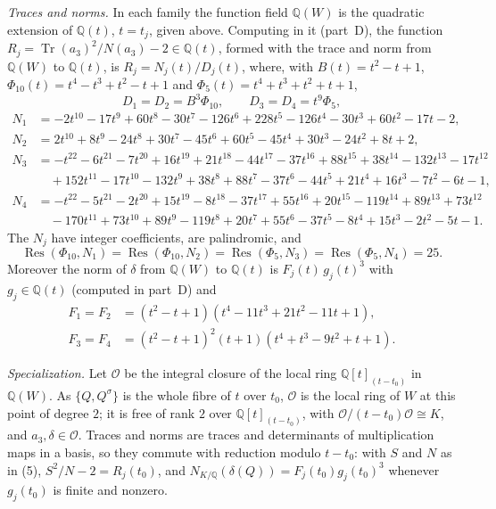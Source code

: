 \documentclass[11pt]{article}
\newcommand{\Q}{\mathbb Q}
\DeclareMathOperator{\Res}{Res}
\begin{document}
\emph{Traces and norms.} In each family the function field \(\Q(W)\) is the quadratic extension of
\(\Q(t)\), \(t=t_j\), given above. Computing in it (part~D), the function
\(R_j=\operatorname{Tr}(a_3)^2/N(a_3)-2\in\Q(t)\), formed with the trace and norm from \(\Q(W)\) to
\(\Q(t)\), is \(R_j=N_j(t)/D_j(t)\), where, with \(B(t)=t^2-t+1\), \(\Phi_{10}(t)=t^4-t^3+t^2-t+1\)
and \(\Phi_5(t)=t^4+t^3+t^2+t+1\),
\[D_1=D_2=B^3\Phi_{10},\qquad D_3=D_4=t^9\Phi_5,\]
\[\begin{aligned}
N_1&=-2t^{10}-17t^9+60t^8-30t^7-126t^6+228t^5-126t^4-30t^3+60t^2-17t-2,\\
N_2&=2t^{10}+8t^9-24t^8+30t^7-45t^6+60t^5-45t^4+30t^3-24t^2+8t+2,\\
N_3&=-t^{22}-6t^{21}-7t^{20}+16t^{19}+21t^{18}-44t^{17}-37t^{16}+88t^{15}+38t^{14}-132t^{13}-17t^{12}\\
&\quad+152t^{11}-17t^{10}-132t^9+38t^8+88t^7-37t^6-44t^5+21t^4+16t^3-7t^2-6t-1,\\
N_4&=-t^{22}-5t^{21}-2t^{20}+15t^{19}-8t^{18}-37t^{17}+55t^{16}+20t^{15}-119t^{14}+89t^{13}+73t^{12}\\
&\quad-170t^{11}+73t^{10}+89t^9-119t^8+20t^7+55t^6-37t^5-8t^4+15t^3-2t^2-5t-1.
\end{aligned}\]
The \(N_j\) have integer coefficients, are palindromic, and
\[\Res(\Phi_{10},N_1)=\Res(\Phi_{10},N_2)=\Res(\Phi_5,N_3)=\Res(\Phi_5,N_4)=25.\]
Moreover the norm of \(\delta\) from \(\Q(W)\) to \(\Q(t)\) is \(F_j(t)\,g_j(t)^3\) with
\(g_j\in\Q(t)\) (computed in part~D) and
\[\begin{aligned}
F_1=F_2&=(t^2-t+1)(t^4-11t^3+21t^2-11t+1),\\
F_3=F_4&=(t^2-t+1)^2(t+1)(t^4+t^3-9t^2+t+1).
\end{aligned}\]

\emph{Specialization.} Let \(\mathcal O\) be the integral closure of the local ring
\(\Q[t]_{(t-t_0)}\) in \(\Q(W)\). As \(\{Q,Q^\sigma\}\) is the whole fibre of \(t\) over \(t_0\),
\(\mathcal O\) is the local ring of \(W\) at this point of degree \(2\); it is free of rank \(2\) over
\(\Q[t]_{(t-t_0)}\), with \(\mathcal O/(t-t_0)\mathcal O\cong K\), and \(a_3,\delta\in\mathcal O\). Traces
and norms are traces and determinants of multiplication maps in a basis, so they commute with
reduction modulo \(t-t_0\): with \(S\) and \(N\) as in (5), \(S^2/N-2=R_j(t_0)\), and
\(N_{K/\Q}(\delta(Q))=F_j(t_0)g_j(t_0)^3\) whenever \(g_j(t_0)\) is finite and nonzero.
\end{document}
